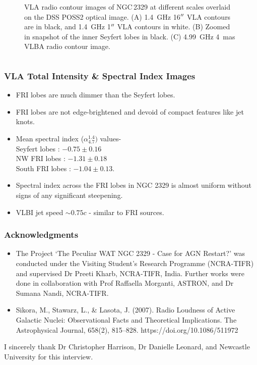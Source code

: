 \documentclass[10pt]{beamer}
\newcommand\Fontvi{\fontsize{6}{7.2}\selectfont}
\newcommand\Fontviii{\fontsize{8}{9.6}\selectfont}
\newcommand\arcsec{\hbox{$^{\prime\prime}$}}
\begin{document}
\begin{frame}
\begin{columns}[T]
\begin{column}{.59\textwidth}
\begin{figure}[htbp]
\caption*{\Fontvi \centering VLA radio contour images of NGC\,2329 at different scales overlaid on the DSS POSS2 optical image. (A) 1.4~GHz 16$\arcsec$ VLA contours are in black, and 1.4~GHz 1$\arcsec$ VLA contours in white. (B) Zoomed in snapshot of the inner Seyfert lobes in black. (C) 4.99~GHz 4~mas VLBA radio contour image.}
\end{figure} 
\end{column}%
\end{columns}
\end{frame}


\begin{frame}
\frametitle{\large VLA Total Intensity \& Spectral Index Images}
\Fontviii
\begin{itemize}
  \item FRI lobes are much dimmer than the Seyfert lobes.
  \item FRI lobes are not edge-brightened and devoid of compact features like jet knots.
  \item Mean spectral index ($\alpha^{1.4}_{4.7})$ values-\\Seyfert lobes  : $-0.75\pm0.16$\\NW FRI lobes : $-1.31\pm0.18$\\South FRI lobes  : $-1.04\pm0.13$.
  \item Spectral index across the FRI lobes in NGC 2329 is almost uniform without signs of any significant steepening.
  \item VLBI jet speed $\sim 0.75c$ - similar to FRI sources.
\end{itemize}
\end{frame}

\begin{frame}
\Fontviii
\frametitle{Acknowledgments}
\hspace*{0.5cm}
\begin{itemize}
  \item The Project `The Peculiar WAT NGC 2329 - Case for AGN Restart?' was conducted under the Visiting Student's Research Programme (NCRA-TIFR) and supervised Dr Preeti Kharb, NCRA-TIFR, India. Further works were done in collaboration with Prof Raffaella Morganti, ASTRON, and Dr Sumana Nandi, NCRA-TIFR.
  \hspace*{0.5cm}
  \item Sikora, M., Stawarz, L., \& Lasota, J. (2007). Radio Loudness of Active Galactic Nuclei: Observational Facts and Theoretical Implications. The Astrophysical Journal, 658(2), 815–828. https://doi.org/10.1086/511972    
\end{itemize}
\hspace*{0.5cm}
I sincerely thank Dr Christopher Harrison, Dr Danielle Leonard, and Newcastle University for this interview.
\end{frame}
\end{document}
